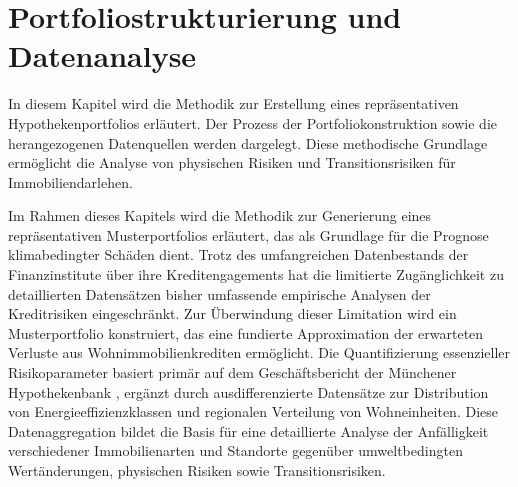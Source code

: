 \section{Portfoliostrukturierung und Datenanalyse}

In diesem Kapitel wird die Methodik zur Erstellung eines repräsentativen Hypothekenportfolios erläutert. Der Prozess der Portfoliokonstruktion sowie die herangezogenen Datenquellen werden dargelegt. Diese methodische Grundlage ermöglicht die Analyse von physischen Risiken und Transitionsrisiken für Immobiliendarlehen.

Im Rahmen dieses Kapitels wird die Methodik zur Generierung eines repräsentativen Musterportfolios erläutert, das als Grundlage für die Prognose klimabedingter Schäden dient. Trotz des umfangreichen Datenbestands der Finanzinstitute über ihre Kreditengagements hat die limitierte Zugänglichkeit zu detaillierten Datensätzen bisher umfassende empirische Analysen der Kreditrisiken eingeschränkt. Zur Überwindung dieser Limitation wird ein Musterportfolio konstruiert, das eine fundierte Approximation der erwarteten Verluste aus Wohnimmobilienkrediten ermöglicht. Die Quantifizierung essenzieller Risikoparameter basiert primär auf dem Geschäftsbericht der Münchener Hypothekenbank \parencite{MuenchenerHyp2023}, ergänzt durch ausdifferenzierte Datensätze zur Distribution von Energieeffizienzklassen und regionalen Verteilung von Wohneinheiten. Diese Datenaggregation bildet die Basis für eine detaillierte Analyse der Anfälligkeit verschiedener Immobilienarten und Standorte gegenüber umweltbedingten Wertänderungen, physischen Risiken sowie Transitionsrisiken. 







